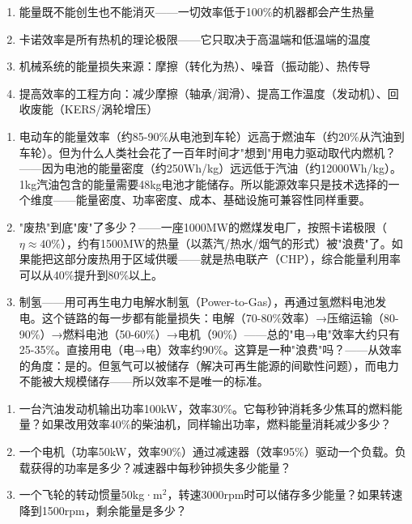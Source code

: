 \documentclass[a4paper,11pt]{ctexbook}
\newenvironment{lessonsummary}{
  \vspace{0.3cm}
  \noindent\begin{tcolorbox}[colback=summarybg,colframe=green!50!black,title=\textbf{\textcolor{green!50!black}{总结}}]
  \vspace{0.1cm}
}{\end{tcolorbox}\vspace{0.3cm}}
\newenvironment{discuss}{
  \vspace{0.3cm}
  \noindent\begin{tcolorbox}[colback=discussbg,colframe=orange!60!black,title=\textbf{\textcolor{orange!60!black}{讨论题}}]
  \vspace{0.1cm}
}{\end{tcolorbox}\vspace{0.3cm}}
\newenvironment{exercises}{
  \vspace{0.3cm}
  \noindent\begin{tcolorbox}[colback=blue!3!white,colframe=blue!50!black,title=\textbf{\textcolor{blue!50!black}{课后练习}}]
  \vspace{0.1cm}
}{\end{tcolorbox}\vspace{0.3cm}}
\begin{document}
\begin{lessonsummary}
\begin{enumerate}
  \item 能量既不能创生也不能消灭——一切效率低于100\%的机器都会产生热量
  \item 卡诺效率是所有热机的理论极限——它只取决于高温端和低温端的温度
  \item 机械系统的能量损失来源：摩擦（转化为热）、噪音（振动能）、热传导
  \item 提高效率的工程方向：减少摩擦（轴承/润滑）、提高工作温度（发动机）、回收废能（KERS/涡轮增压）
\end{enumerate}
\end{lessonsummary}

\begin{discuss}
\begin{enumerate}
  \item 电动车的能量效率（约85-90\%从电池到车轮）远高于燃油车（约20\%从汽油到车轮）。但为什么人类社会花了一百年时间才"想到"用电力驱动取代内燃机？——因为电池的能量密度（约250Wh/kg）远远低于汽油（约12000Wh/kg）。1kg汽油包含的能量需要48kg电池才能储存。所以能源效率只是技术选择的一个维度——能量密度、功率密度、成本、基础设施可兼容性同样重要。
  \item "废热"到底"废"了多少？——一座1000MW的燃煤发电厂，按照卡诺极限（$\eta \approx 40\%$），约有1500MW的热量（以蒸汽/热水/烟气的形式）被"浪费"了。如果能把这部分废热用于区域供暖——就是热电联产（CHP），综合能量利用率可以从40\%提升到80\%以上。
  \item 制氢——用可再生电力电解水制氢（Power-to-Gas），再通过氢燃料电池发电。这个链路的每一步都有能量损失：电解（70-80\%效率）→压缩运输（80-90\%）→燃料电池（50-60\%）→电机（90\%）——总的"电→电"效率大约只有25-35\%。直接用电（电→电）效率约90\%。这算是一种"浪费"吗？——从效率的角度：是的。但氢气可以被储存（解决可再生能源的间歇性问题），而电力不能被大规模储存——所以效率不是唯一的标准。
\end{enumerate}
\end{discuss}

\begin{exercises}
\begin{enumerate}
  \item 一台汽油发动机输出功率100kW，效率30\%。它每秒钟消耗多少焦耳的燃料能量？如果改用效率40\%的柴油机，同样输出功率，燃料能量消耗减少多少？
  \item 一个电机（功率50kW，效率90\%）通过减速器（效率95\%）驱动一个负载。负载获得的功率是多少？减速器中每秒钟损失多少能量？
  \item 一个飞轮的转动惯量50kg·m$^2$，转速3000rpm时可以储存多少能量？如果转速降到1500rpm，剩余能量是多少？
\end{enumerate}
\end{exercises}
\end{document}
